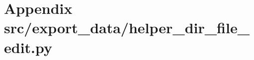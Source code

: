 \section{Appendix \/src/export\_data/helper\_dir\_file\_edit.py}\label{app:helper_dir_file_edit.py}
